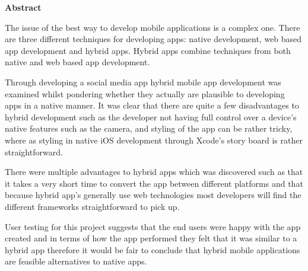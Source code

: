 \thispagestyle{empty}

\begin{center}
    {\LARGE\bf Abstract}
\end{center}

The issue of the best way to develop mobile applications is a complex one. There are three different techniques for developing apps: native development, web based app development and hybrid apps. Hybrid apps combine techniques from both native and web based app development.

Through developing a social media app hybrid mobile app development was examined whilst pondering whether they actually are plausible to developing apps in a native manner. It was clear that there are quite a few disadvantages to hybrid development such as the developer not having full control over a device's native features such as the camera, and styling of the app can be rather tricky, where as styling in native iOS development through Xcode's story board is rather straightforward. 

There were multiple advantages to hybrid apps which was discovered such as that it takes a very short time to convert the app between different platforms and that because hybrid app's generally use web technologies most developers will find the different frameworks straightforward to pick up. 

User testing for this project suggests that the end users were happy with the app created and in terms of how the app performed they felt that it was similar to a hybrid app therefore it would be fair to conclude that hybrid mobile applications are feasible alternatives to native apps.
